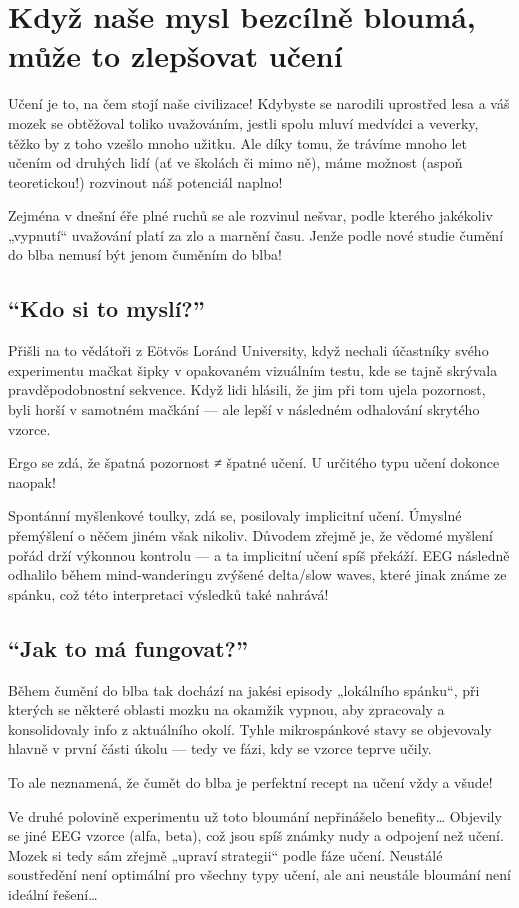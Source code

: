 \documentclass[main.tex]{subfiles}
\begin{document}
\section{Když naše mysl bezcílně bloumá, může to zlepšovat učení}
Učení je to, na čem stojí naše civilizace! Kdybyste se narodili uprostřed lesa a váš mozek se obtěžoval toliko uvažováním, jestli spolu mluví medvídci a veverky, těžko by z toho vzešlo mnoho užitku. Ale díky tomu, že trávíme mnoho let učením od druhých lidí (ať ve školách či mimo ně), máme možnost (aspoň teoretickou!) rozvinout náš potenciál naplno!\par
Zejména v dnešní éře plné ruchů se ale rozvinul nešvar, podle kterého jakékoliv „vypnutí“ uvažování platí za zlo a marnění času. Jenže podle nové studie čumění do blba nemusí být jenom čuměním do blba!
\subsection*{\enquote{Kdo si to myslí?}}
Přišli na to vědátoři z Eötvös Loránd University, když nechali účastníky svého experimentu mačkat šipky v opakovaném vizuálním testu, kde se tajně skrývala pravděpodobnostní sekvence. Když lidi hlásili, že jim při tom ujela pozornost, byli horší v samotném mačkání — ale lepší v následném odhalování skrytého vzorce.\par
Ergo se zdá, že špatná pozornost ≠ špatné učení. U určitého typu učení dokonce naopak!\par
Spontánní myšlenkové toulky, zdá se, posilovaly implicitní učení. Úmyslné přemýšlení o něčem jiném však nikoliv. Důvodem zřejmě je, že vědomé myšlení pořád drží výkonnou kontrolu — a ta implicitní učení spíš překáží. EEG následně odhalilo během mind-wanderingu zvýšené delta/slow waves, které jinak známe ze spánku, což této interpretaci výsledků také nahrává!
\subsection*{\enquote{Jak to má fungovat?}}
Během čumění do blba tak dochází na jakési episody „lokálního spánku“, při kterých se některé oblasti mozku na okamžik vypnou, aby zpracovaly a konsolidovaly info z aktuálního okolí. Tyhle mikrospánkové stavy se objevovaly hlavně v první části úkolu — tedy ve fázi, kdy se vzorce teprve učily.\par
To ale neznamená, že čumět do blba je perfektní recept na učení vždy a všude!\par
Ve druhé polovině experimentu už toto bloumání nepřinášelo benefity… Objevily se jiné EEG vzorce (alfa, beta), což jsou spíš známky nudy a odpojení než učení. Mozek si tedy sám zřejmě „upraví strategii“ podle fáze učení. Neustálé soustředění není optimální pro všechny typy učení, ale ani neustále bloumání není ideální řešení…
\end{document}
